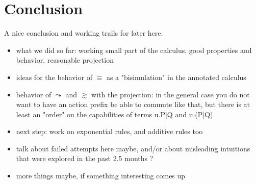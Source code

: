 \section*{Conclusion}

A nice conclusion and working trails for later here. %
\begin{itemize}
	\item what we did so far: working small part of the calculus, good properties and behavior, reasonable projection
	\item ideas for the behavior of $\equiv$ as a "bisimulation" in the annotated calculus
	\item behavior of $\leadsto$ and $\gtrsim$ with the projection: in the general case you do not want to have an action prefix be able to commute like that, but there is at least an "order" on the capabilities of terms u.P|Q and u.(P|Q)
	\item next step: work on exponential rules, and additive rules too
	\item talk about failed attempts here maybe, and/or about misleading intuitions that were explored in the past 2.5 months ?
	\item more things maybe, if something interesting comes up
\end{itemize}